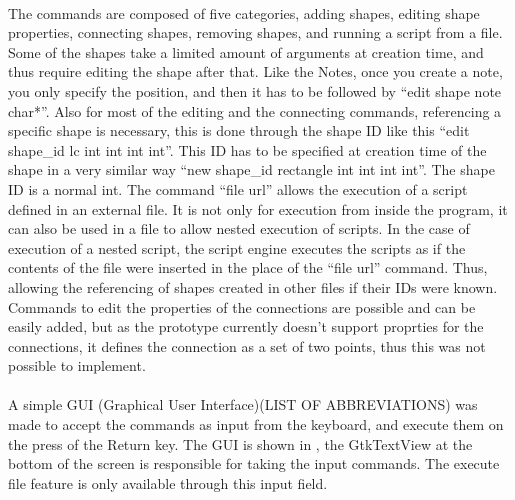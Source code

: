 \paragraph{} 
The commands are composed of five categories, adding shapes, editing shape properties, connecting shapes, removing shapes, and running a script from a file.
Some of the shapes take a limited amount of arguments at creation time, and thus require editing the shape after that. Like the Notes, once you create a note, you only specify the position, and then it has to be followed by ``edit shape note char*''. Also for most of the editing and the connecting commands, referencing a specific shape is necessary, this is done through the shape ID like this ``edit shape\_id lc int int int int''. This ID has to be specified at creation time of the shape in a very similar way ``new shape\_id rectangle int int int int''. The shape ID is a normal int.
The command ``file url'' allows the execution of a script defined in an external file. It is not only for execution from inside the program, it can also be used in a file to allow nested execution of scripts. In the case of execution of a nested script, the script engine executes the scripts as if the contents of the file were inserted in the place of the ``file url'' command. Thus, allowing the referencing of shapes created in other files if their IDs were known.
Commands to edit the properties of the connections are possible and can be easily added, but as the prototype currently doesn't support proprties for the connections, it defines the connection as a set of two points, thus this was not possible to implement.

\paragraph{}
A simple GUI (Graphical User Interface)(LIST OF ABBREVIATIONS) was made to accept the commands as input from the keyboard, and execute them on the press of the Return key. The GUI is shown in , the GtkTextView at the bottom of the screen is responsible for taking the input commands. The execute file feature is only available through this input field.



